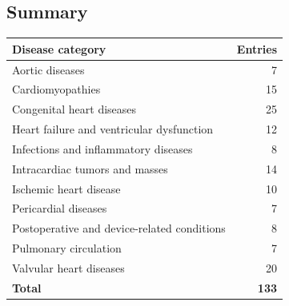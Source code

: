 \subsection{Summary}
\begin{center}
\begin{tabular}{@{}p{}r@{}}
\toprule
\textbf{Disease category} & \textbf{Entries} \\
\midrule
Aortic diseases & 7 \\
Cardiomyopathies & 15 \\
Congenital heart diseases & 25 \\
Heart failure and ventricular dysfunction & 12 \\
Infections and inflammatory diseases & 8 \\
Intracardiac tumors and masses & 14 \\
Ischemic heart disease & 10 \\
Pericardial diseases & 7 \\
Postoperative and device-related conditions & 8 \\
Pulmonary circulation & 7 \\
Valvular heart diseases & 20 \\
\midrule
\textbf{Total} & \textbf{133} \\
\bottomrule
\end{tabular}
\end{center}

